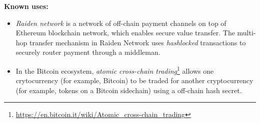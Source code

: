 \vspace{0.5em}\noindent \textbf{Known uses:}
\begin{itemize}
  \item \textit{Raiden network} is a network of off-chain payment channels on top of Ethereum blockchain network, which enables secure value transfer. The multi-hop transfer mechanism in Raiden Network uses \emph{hashlocked} transactions to securely router payment through a middleman.
  \item In the Bitcoin ecosystem, \textit{atomic cross-chain trading}\footnote{\url{https://en.bitcoin.it/wiki/Atomic_cross-chain_trading}} allows one crytocurrency (for example, Bitcoin) to be traded for another cryptocurrency (for example, tokens on a Bitcoin sidechain) using a off-chain hash secret.
\end{itemize}







